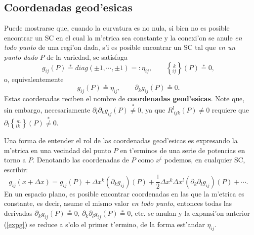 %


\subsection{Coordenadas geod'esicas}\label{secCG}

Puede mostrarse que, cuando la curvatura es no nula, si bien no es posible encontrar un SC en el cual la m'etrica sea constante y la conexi'on se anule \textit{en todo punto} de una regi'on dada, s'i es posible encontrar un SC tal que \textit{en un punto dado} $P$ de la variedad, se satisfaga
\begin{equation}
 g_{ij}(P)\overset{\ast}{=}diag(\pm 1,\cdots,\pm 1)=:\eta_{ij}, \qquad \left\{_{ij}^{\,
k}\right\}(P) \overset{\ast}{=}0,
\end{equation}
o, equivalentemente
\begin{equation}
 g_{ij}(P)\overset{\ast}{=}\eta_{ij}, \qquad \partial_k
g_{ij}(P) \overset{\ast}{=}0. \label{cg1}
\end{equation}
Estas coordenadas reciben el nombre de \textbf{coordenadas geod'esicas}.
Note que, sin embargo, necesariamente $\partial_l\partial_k g_{ij}(P)\overset{\ast}{\neq}0$, ya que $R_{\
ijk}^l(P)\neq0$ requiere que $\partial_l\left\{
_{ik}^{\,m}\right\}(P)\overset{\ast}{\neq}0$.

Una forma de entender el rol de las coordenadas geod'esicas es expresando la m'etrica en una vecindad del punto $P$ en t'erminos de una serie de potencias en torno a $P$. Denotando las coordenadas de $P$ como $x^i$ podemos, en cualquier SC, escribir:
\begin{equation}
 g_{ij}(x+\Delta x)=g_{ij}(P)+\Delta x^k(\partial_kg_{ij})(P)+\frac{1}{2}\Delta x^k\Delta x^l(\partial_k\partial_lg_{ij})(P)+\cdots . \label{expg}
\end{equation}
En un espacio plano, es posible encontrar coordenadas en las que la m'etrica es constante, es decir, asume el mismo valor \textit{en todo punto}, entonces todas las derivadas $\partial_kg_{ij}(P)\stackrel{*}{=}0$, $\partial_k\partial_lg_{ij}(P)\stackrel{*}{=}0$, etc. se anulan y la expansi'on anterior (\ref{expg}) se reduce a s'olo el primer t'ermino, de la forma est'andar $\eta_{ij}$.

